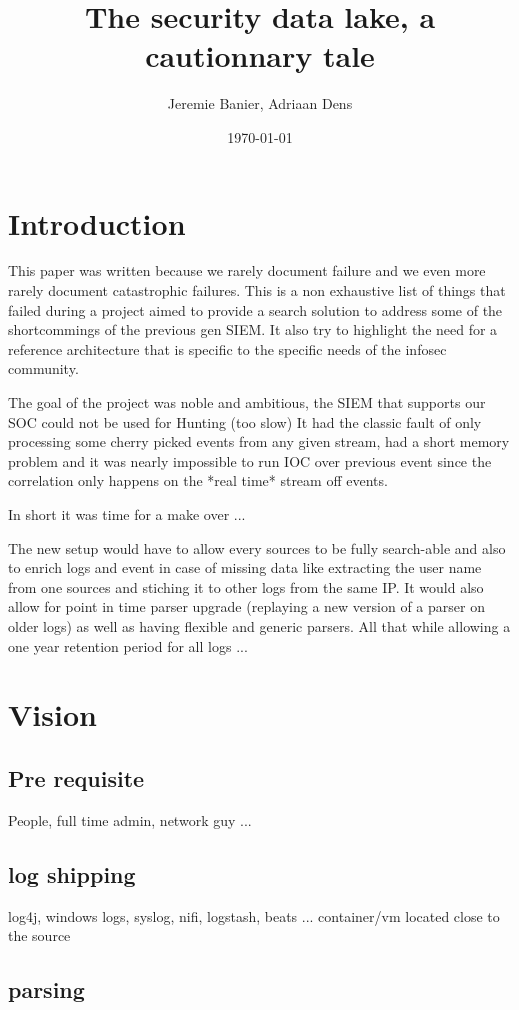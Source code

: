 \documentclass[a4paper,12pt]{article}
\begin{document}
\title{The security data lake, a cautionnary tale}
\author{Jeremie Banier, Adriaan Dens}
\date{\today}
\maketitle
\newpage
\tableofcontents
\newpage
\section{Introduction}
This paper was written because we rarely document failure and we even more rarely document 
catastrophic failures. This is a non exhaustive list of things that failed during a project aimed 
to provide a search solution to address some of the shortcommings of the previous gen SIEM.
It also try to highlight the need for a reference architecture that is specific to the specific needs of the infosec community.

The goal of the project was noble and ambitious, the SIEM that supports our SOC could not be used for Hunting (too slow) 
It had the classic fault of only processing some cherry picked events from any given stream, had a short memory problem and it was nearly impossible 
to run IOC over previous event since the correlation only happens on the *real time* stream off events.

In short it was time for a make over ... 

The new setup would have to allow every sources to be fully search-able and also to enrich logs and event in case of missing data
like extracting the user name from one sources and stiching it to other logs from the same IP.
It would also allow for point in time parser upgrade (replaying a new  version of a parser on older logs) as well as having flexible and 
generic parsers. All that while allowing a one year retention period for all logs ...
\newpage
\section{Vision}
\subsection{Pre requisite}
People, full time admin, network guy ...
\subsection{log shipping}
log4j, windows logs, syslog, nifi, logstash, beats ...
container/vm located close to the source
\subsection{parsing}
\end{document}
